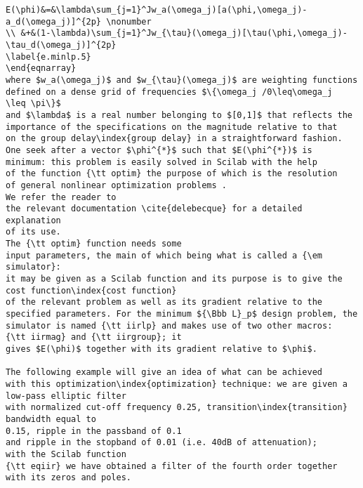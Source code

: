 {\begin{verbatim}
E(\phi)&=&\lambda\sum_{j=1}^Jw_a(\omega_j)[a(\phi,\omega_j)-a_d(\omega_j)]^{2p} \nonumber
\\ &+&(1-\lambda)\sum_{j=1}^Jw_{\tau}(\omega_j)[\tau(\phi,\omega_j)-
\tau_d(\omega_j)]^{2p}
\label{e.minlp.5}
\end{eqnarray}
where $w_a(\omega_j)$ and $w_{\tau}(\omega_j)$ are weighting functions 
defined on a dense grid of frequencies $\{\omega_j /0\leq\omega_j 
\leq \pi\}$
and $\lambda$ is a real number belonging to $[0,1]$ that reflects the 
importance of the specifications on the magnitude relative to that 
on the group delay\index{group delay} in a straightforward fashion.
One seek after a vector $\phi^{*}$ such that $E(\phi^{*})$ is 
minimum: this problem is easily solved in Scilab with the help 
of the function {\tt optim} the purpose of which is the resolution 
of general nonlinear optimization problems . 
We refer the reader to
the relevant documentation \cite{delebecque} for a detailed explanation 
of its use.
The {\tt optim} function needs some 
input parameters, the main of which being what is called a {\em simulator}: 
it may be given as a Scilab function and its purpose is to give the cost function\index{cost function} 
of the relevant problem as well as its gradient relative to the 
specified parameters. For the minimum ${\Bbb L}_p$ design problem, the 
simulator is named {\tt iirlp} and makes use of two other macros: 
{\tt iirmag} and {\tt iirgroup}; it 
gives $E(\phi)$ together with its gradient relative to $\phi$.

The following example will give an idea of what can be achieved 
with this optimization\index{optimization} technique: we are given a low-pass elliptic filter 
with normalized cut-off frequency 0.25, transition\index{transition} 
bandwidth equal to
0.15, ripple in the passband of 0.1 
and ripple in the stopband of 0.01 (i.e. 40dB of attenuation); 
with the Scilab function 
{\tt eqiir} we have obtained a filter of the fourth order together 
with its zeros and poles. 


\end{verbatim}}
